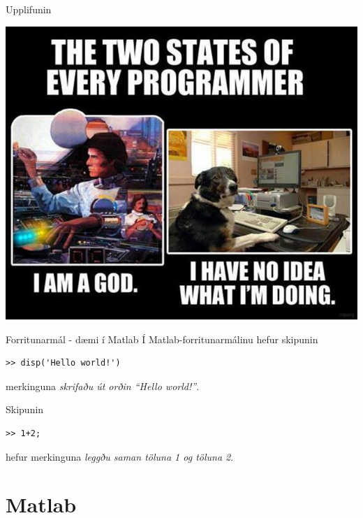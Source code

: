 \documentclass[handout]{beamer}
\begin{document}
\begin{frame}{Upplifunin}
\begin{center}
\includegraphics[height=0.85\textheight]{Pics/twostates} 
\end{center}
\end{frame}

\begin{frame}[fragile]{Forritunarmál - dæmi í Matlab}
Í Matlab-forritunarmálinu hefur skipunin
\begin{verbatim}
>> disp('Hello world!')
\end{verbatim}
merkinguna \emph{skrifaðu út orðin ``Hello world!''}.

\vspace{0.5cm}
Skipunin
\begin{verbatim}
>> 1+2;
\end{verbatim}
hefur merkinguna \emph{leggðu saman töluna 1 og töluna 2}.
\end{frame}

\section{Matlab}
\end{document}
